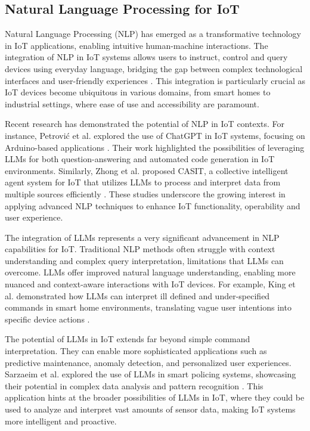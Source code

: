 \documentclass{ieeeaccess}
\begin{document}
\subsection{Natural Language Processing for IoT}
Natural Language Processing (NLP) has emerged as a transformative technology in IoT applications, enabling intuitive human-machine interactions. The integration of NLP in IoT systems allows users to instruct, control and query devices using everyday language, bridging the gap between complex technological interfaces and user-friendly experiences \cite{10.1145/3643505}. This integration is particularly crucial as IoT devices become ubiquitous in various domains, from smart homes to industrial settings, where ease of use and accessibility are paramount.

Recent research has demonstrated the potential of NLP in IoT contexts. For instance, Petrović et al. explored the use of ChatGPT in IoT systems, focusing on Arduino-based applications \cite{10315791}. Their work highlighted the possibilities of leveraging LLMs for both question-answering and automated code generation in IoT environments. Similarly, Zhong et al. proposed CASIT, a collective intelligent agent system for IoT that utilizes LLMs to process and interpret data from multiple sources efficiently \cite{10439991}. These studies underscore the growing interest in applying advanced NLP techniques to enhance IoT functionality, operability and user experience.

The integration of LLMs represents a very significant advancement in NLP capabilities for IoT. Traditional NLP methods often struggle with context understanding and complex query interpretation, limitations that LLMs can overcome. LLMs offer improved natural language understanding, enabling more nuanced and context-aware interactions with IoT devices. For example, King et al. demonstrated how LLMs can interpret ill defined and under-specified commands in smart home environments, translating vague user intentions into specific device actions \cite{10.1145/3643505}.

The potential of LLMs in IoT extends far beyond simple command interpretation. They can enable more sophisticated applications such as predictive maintenance, anomaly detection, and personalized user experiences. Sarzaeim et al. explored the use of LLMs in smart policing systems, showcasing their potential in complex data analysis and pattern recognition \cite{10538107}. This application hints at the broader possibilities of LLMs in IoT, where they could be used to analyze and interpret vast amounts of sensor data, making IoT systems more intelligent and proactive.
\end{document}
